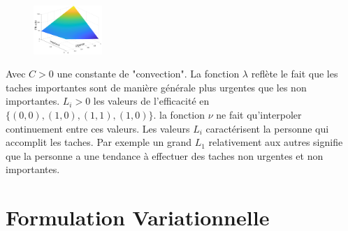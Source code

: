 \documentclass[french]{article}
\begin{document}
    \begin{figure}
        \begin{center}
            \includegraphics[width=0.23\textwidth]{Figures/Efficacite.png}
        \end{center}
    \end{figure}

    Avec $C > 0$ une constante de "convection". La fonction $\lambda$ reflète le fait que les taches importantes sont de manière générale plus urgentes que les non importantes. 
    $L_i > 0$ les valeurs de l'efficacité en $\{(0,0),(1,0),(1,1),(1,0)\}$. la fonction $\nu$ ne fait qu'interpoler continuement entre ces valeurs. Les valeurs $L_i$ caractérisent la personne qui accomplit les taches. Par exemple un grand $L_1$ relativement aux autres signifie que  la personne a une tendance à effectuer des taches non urgentes et non importantes.
    
    
    \section{Formulation Variationnelle}
    
\end{document}
